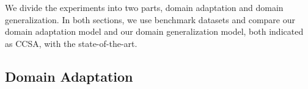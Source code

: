 \begin{table}[t]
\caption{\textbf{MNIST-USPS datasets.} Classification accuracy for domain adaptation over the MNIST and USPS datasets.  and  stand for MNIST and USPS domain. {\tt Lower Bound} is our base model without adaptation. {\tt \modelDA- } stands for our method when we use  labeled target samples per category in training.}
\label{tab-MNIST-USPS}
\centering
{}
\end{table}



We divide the experiments into two parts, domain adaptation and domain generalization. In both sections, we use
benchmark datasets and compare our domain adaptation
model and our domain generalization model, both indicated
as CCSA, with the state-of-the-art.


\subsection{Domain Adaptation}



